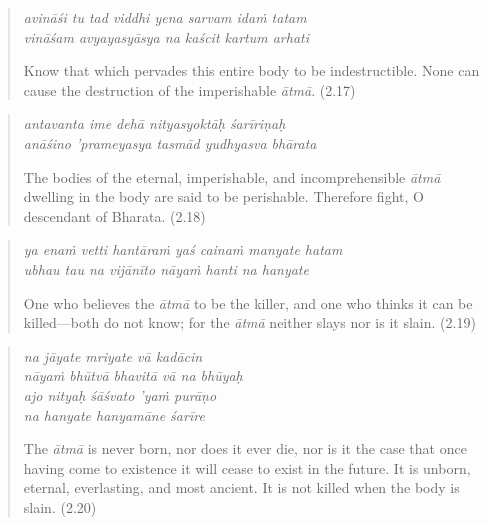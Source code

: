 \documentclass[12pt, twoside, openright]{memoir}
\begin{document}
\par
\begin{verse}
\textit{avināśi tu tad viddhi yena sarvam idaṁ tatam} \\
\textit{vināśam avyayasyāsya na kaścit kartum arhati}

\noindent Know that which pervades this entire body to be indestructible. None can cause the destruction of the imperishable \textit{ātmā}. (2.17)
\end{verse}
\par



\par
\begin{verse}
\textit{antavanta ime dehā nityasyoktāḥ śarīriṇaḥ} \\
\textit{anāśino ’prameyasya tasmād yudhyasva bhārata}

\noindent The bodies of the eternal, imperishable, and incomprehensible \textit{ātmā} dwelling in the body are said to be perishable. Therefore fight, O descendant of Bharata. (2.18)
\end{verse}
\par



\par
\begin{verse}
\textit{ya enaṁ vetti hantāraṁ yaś cainaṁ manyate hatam} \\
\textit{ubhau tau na vijānīto nāyaṁ hanti na hanyate}

\noindent One who believes the \textit{ātmā} to be the killer, and one who thinks it can be killed---both do not know; for the \textit{ātmā} neither slays nor is it slain. (2.19)
\end{verse}
\par



\par
\begin{verse}
\textit{na jāyate mriyate vā kadācin} \\
\textit{nāyaṁ bhūtvā bhavitā vā na bhūyaḥ} \\
\textit{ajo nityaḥ śāśvato ’yaṁ purāṇo} \\
\textit{na hanyate hanyamāne śarīre}

\noindent The \textit{ātmā} is never born, nor does it ever die, nor is it the case that once having come to existence it will cease to exist in the future. It is unborn, eternal, everlasting, and most ancient. It is not killed when the body is slain. (2.20)
\end{verse}
\par
\end{document}
